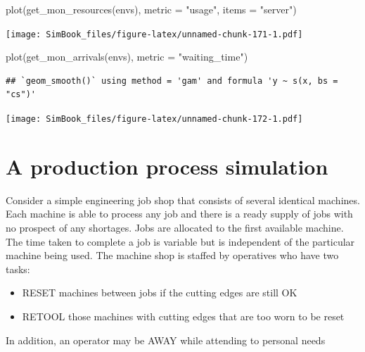 \documentclass[
]{book}
\newenvironment{Shaded}{\begin{snugshade}}{\end{snugshade}}
\newcommand{\AttributeTok}[1]{\textcolor[rgb]{0.77,0.63,0.00}{#1}}
\newcommand{\FunctionTok}[1]{\textcolor[rgb]{0.00,0.00,0.00}{#1}}
\newcommand{\NormalTok}[1]{#1}
\newcommand{\StringTok}[1]{\textcolor[rgb]{0.31,0.60,0.02}{#1}}
\begin{document}
\begin{Shaded}
\begin{Highlighting}[]
\FunctionTok{plot}\NormalTok{(}\FunctionTok{get\_mon\_resources}\NormalTok{(envs), }\AttributeTok{metric =} \StringTok{"usage"}\NormalTok{, }\AttributeTok{items =} \StringTok{"server"}\NormalTok{)}
\end{Highlighting}
\end{Shaded}

\texttt{[image: SimBook\_files/figure-latex/unnamed-chunk-171-1.pdf]}

\begin{Shaded}
\begin{Highlighting}[]
\FunctionTok{plot}\NormalTok{(}\FunctionTok{get\_mon\_arrivals}\NormalTok{(envs), }\AttributeTok{metric =} \StringTok{"waiting\_time"}\NormalTok{)}
\end{Highlighting}
\end{Shaded}

\begin{verbatim}
## `geom_smooth()` using method = 'gam' and formula 'y ~ s(x, bs = "cs")'
\end{verbatim}

\texttt{[image: SimBook\_files/figure-latex/unnamed-chunk-172-1.pdf]}

\hypertarget{a-production-process-simulation}{%
\section{A production process simulation}\label{a-production-process-simulation}}

Consider a simple engineering job shop that consists of several identical machines. Each machine is able to process any job and there is a ready supply of jobs with no prospect of any shortages. Jobs are allocated to the first available machine. The time taken to complete a job is variable but is independent of the particular machine being used. The machine shop is staffed by operatives who have two tasks:

\begin{itemize}
\item
  RESET machines between jobs if the cutting edges are still OK
\item
  RETOOL those machines with cutting edges that are too worn to be reset
\end{itemize}

In addition, an operator may be AWAY while attending to personal needs
\end{document}
